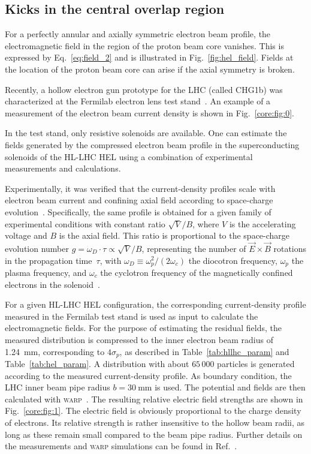 \documentclass[
prstab
,reprint
,linenumbers
,longbibliography
,preprintnumbers
,showkeys
,amsfonts,amssymb,amsmath
,floatfix
]{revtex4-1}
\newcommand{\q}[2]{\ensuremath{#1\ \mathrm{#2}}} %
\newcommand{\code}[1]{\textsc{#1}} %
\begin{document}
\subsection{Kicks in the central overlap region}
\label{core:sec:2}

For a perfectly annular and axially symmetric electron beam profile,
the electromagnetic field in the region of the proton beam core
vanishes. This is expressed by Eq.~\ref{eq:field_2} and is illustrated
in Fig.~\ref{fig:hel_field}. Fields at the location of the proton beam
core can arise if the axial symmetry is broken.

Recently, a hollow electron gun prototype for the LHC (called CHG1b)
was characterized at the Fermilab electron lens test
stand~\cite{hel_test_stand_fnal}. An example of a measurement of the
electron beam current density is shown in Fig.~\ref{core:fig:0}.

In the test stand, only resistive solenoids are available. One can
estimate the fields generated by the compressed electron beam profile
in the superconducting solenoids of the HL-LHC HEL using a combination
of experimental measurements and calculations.

Experimentally, it was verified that the current-density profiles
scale with electron beam current and confining axial field according
to space-charge evolution~\cite{Jo:PoP:2018,
  hel_res_field_stancari_2017}. Specifically, the same profile is
obtained for a given family of experimental conditions with constant
ratio $\sqrt{V} / B$, where $V$ is the accelerating voltage and $B$ is
the axial field. This ratio is proportional to the space-charge
evolution number $g = \omega_D \cdot \tau \propto \sqrt{V}/B$,
representing the number of $\vec{E} \times \vec{B}$ rotations in the
propagation time~$\tau$, with
$\omega_D \equiv \omega_p^2 / (2 \omega_c)$ the diocotron frequency,
$\omega_p$ the plasma frequency, and $\omega_c$ the cyclotron
frequency of the magnetically confined electrons in the
solenoid~\cite{Davidson:nonneutral-plasmas:2001}.

For a given HL-LHC HEL configuration, the corresponding
current-density profile measured in the Fermilab test stand is used as
input to calculate the electromagnetic fields. For the purpose of
estimating the residual fields, the measured distribution is
compressed to the inner electron beam radius of 1.24~mm, corresponding
to $4\sigma_p$, as described in Table~\ref{tab:hllhc_param} and
Table~\ref{tab:hel_param}. A distribution with about $65\,000$
particles is generated according to the measured current-density
profile. As boundary condition, the LHC inner beam pipe radius
$b = \q{30}{mm}$ is used. The potential and fields are then calculated
with \code{warp}~\cite{warp, Friedman:IEEE-plasma:2014}. The resulting
relative electric field strengths are shown in
Fig.~\ref{core:fig:1}. The electric field is obviously proportional to
the charge density of electrons. Its relative strength is rather
insensitive to the hollow beam radii, as long as these remain small
compared to the beam pipe radius. Further details on the measurements
and \code{warp} simulations can be found in
Ref.~\cite{hel_res_field_stancari_2017}.
\end{document}
